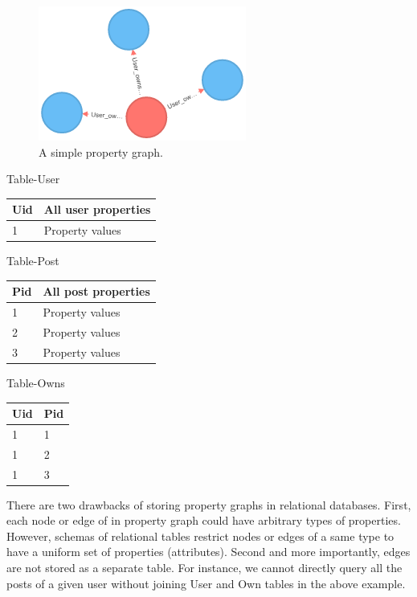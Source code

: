 \begin {figure}[H]
\centering
\includegraphics[scale=0.9]{pic/4.png}
\caption{A simple property graph.}
\end{figure}

Table-User
\begin{center}
\begin{tabular}{ l | l }  
	Uid	&{All user properties}	\\ \hline 
	1	&{Property values} \\
\end{tabular}
\end {center}

Table-Post
\begin{center}
	\begin{tabular}{ l | l }  
		Pid	& {All post properties}	\\ \hline 
		1	&{Property values} \\
		2	&{Property values} \\
		3	&{Property values} \\
	\end{tabular}
	\end {center}	
 
Table-Owns
\begin{center}
	\begin{tabular}{ l | l }  
		Uid	& Pid	\\ \hline 
		1	&1 \\
		1	&2 \\
		1	&3 \\
	\end{tabular}
	\end {center}

 
There are two drawbacks of storing property graphs in relational databases. First, each node or edge of in property graph could have arbitrary types of properties. However, schemas of relational tables restrict nodes or edges of a same type to have a uniform set of properties (attributes). Second and more importantly, edges are not stored as a separate table. For instance, we cannot directly query all the posts of a given user without joining User and Own tables in the above example.
 
